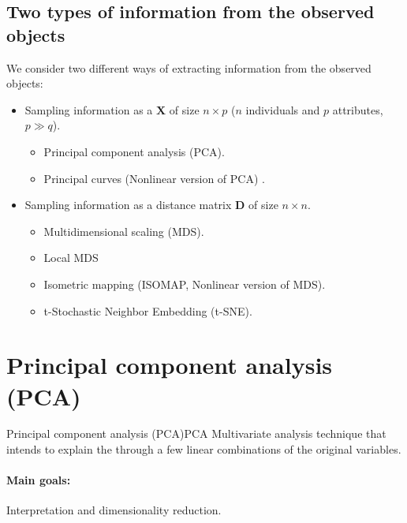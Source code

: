 \subsection{Two types of information from the observed objects}
We consider two different ways of extracting information from the observed objects:
\begin{itemize}
    \item Sampling information as a  $\boldsymbol{X}$ of
        size $n \times p$ ($n$ individuals and $p$ attributes, $p \gg q$).
        \begin{itemize}
            \item Principal component analysis (PCA).
            \item Principal curves (Nonlinear version of PCA) \cite{hastie_principal_1989,delicado_another_2001}.
        \end{itemize}
    \item Sampling information as a distance matrix $\boldsymbol{D}$ of size
        $n \times n$.
        \begin{itemize}
            \item Multidimensional scaling (MDS).
            \item Local MDS
            \item Isometric mapping (ISOMAP, Nonlinear version of MDS).
            \item t-Stochastic Neighbor Embedding (t-SNE).
        \end{itemize}
\end{itemize}

\section[PCA]{Principal component analysis (PCA)}

\begin{definition}{Principal component analysis (PCA)}{PCA}
    Multivariate analysis technique that intends to explain the
     through a few linear combinations of the original
    variables.

    \paragraph{Main goals:} Interpretation and dimensionality reduction.
\end{definition}


